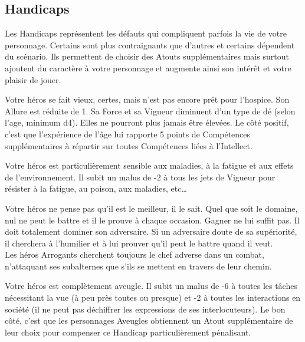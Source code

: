 \subsection{Handicaps}

Les Handicaps représentent les défauts qui compliquent parfois la vie de votre personnage. Certains sont plus contraignants que d’autres et certains dépendent du scénario. Ils permettent de choisir des Atouts supplémentaires mais surtout ajoutent du caractère à votre personnage et augmente ainsi son intérêt et votre plaisir de jouer.

\begin{description}[align=left]
    \item [Âgé (Majeur)]
        Votre héros se fait vieux, certes, mais n’est pas encore prêt pour l’hospice. Son Allure est réduite de 1. Sa Force et sa Vigueur diminuent d’un type de dé (selon l’age, minimum d4). Elles ne pourront plus jamais être élevées. Le côté positif, c’est que l’expérience de l’âge lui rapporte 5 points de Compétences supplémentaires à répartir sur toutes Compétences liées à l’Intellect.

    \item [Anémique (Mineur)]
        Votre héros est particulièrement sensible aux maladies, à la fatigue et aux effets de l’environnement. Il subit un malus de -2 à tous les jets de Vigueur pour résister à la fatigue, au poison, aux maladies, etc\ldots

    \item [Arrogant (Majeur)]
        Votre héros ne pense pas qu’il est le meilleur, il le sait. Quel que soit le domaine, nul ne peut le battre et il le prouve à chaque occasion. Gagner ne lui suffit pas. Il doit totalement dominer son adversaire. Si un adversaire doute de sa supériorité, il cherchera à l’humilier et à lui prouver qu’il peut le battre quand il veut.\\
        Les héros Arrogants cherchent toujours le chef adverse dans un combat, n’attaquant ses subalternes que s’ils se mettent en travers de leur chemin.

    \item [Aveugle (Majeur)]
        Votre héros est complètement aveugle. Il subit un malus de -6 à toutes les tâches nécessitant la vue (à peu près toutes ou presque) et -2 à toutes les interactions en société (il ne peut pas déchiffrer les expressions de ses interlocuteurs). Le bon côté, c’est que les personnages Aveugles obtiennent un Atout supplémentaire de leur choix pour compenser ce Handicap particulièrement pénalisant.


\end{description}

